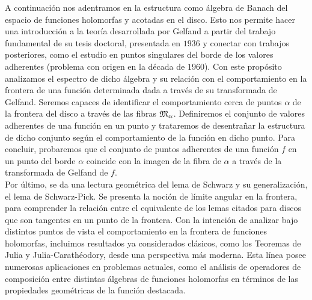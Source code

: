 A continuación nos adentramos en la estructura como álgebra de Banach del espacio de funciones holomorfas y acotadas en el disco. Esto nos permite hacer una introducción a la teoría desarrollada por Gelfand a partir del trabajo fundamental de su tesis doctoral, presentada en $1936$ y conectar con trabajos posteriores, como el estudio en puntos singulares del borde de los valores adherentes (problema con origen en la década de $1960$). Con este propósito analizamos el espectro de dicho álgebra y su relación con el comportamiento en la frontera de una función determinada dada a través de su transformada de Gelfand. Seremos capaces de identificar el comportamiento cerca de puntos $\alpha$ de la frontera del disco a través de las fibras $\mathfrak{M}_\alpha$. Definiremos el conjunto de valores adherentes de una función en un punto y trataremos de desentrañar la estructura de dicho conjunto según el comportamiento de la función en dicho punto. Para concluir, probaremos que el conjunto de puntos adherentes de una función $f$ en un punto del borde $\alpha$ coincide con la imagen de la fibra de $\alpha$ a través de la transformada de Gelfand de $f$. \\

Por último, se da una lectura geométrica del lema de Schwarz y su generalización, el lema de Schwarz-Pick. Se presenta la noción de límite angular en la frontera, para comprender la relación entre el equivalente de los lemas citados para discos que son tangentes en un punto de la frontera. Con la intención de analizar bajo distintos puntos de vista el comportamiento en la frontera de funciones holomorfas, incluimos resultados ya considerados clásicos, como los Teoremas de Julia y Julia-Carathéodory, desde una perspectiva más moderna. Esta línea posee numerosas aplicaciones en problemas actuales, como el análisis de operadores de composición entre distintas álgebras de funciones holomorfas en términos de las propiedades geométricas de la función destacada. \\

